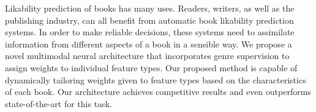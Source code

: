 Likability prediction of books has many uses. Readers,  writers, as well as the publishing industry, can all benefit from automatic book likability prediction systems. In order to make reliable decisions, these systems need to assimilate information from different aspects of a book in a sensible way. We propose a novel multimodal neural architecture that incorporates genre supervision to assign weights to individual feature types. Our proposed method is capable of dynamically tailoring weights given to feature types based on the characteristics of each book. Our architecture achieves competitive results and even outperforms state-of-the-art for this task.
